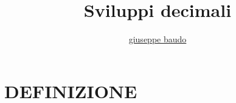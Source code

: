 \documentclass[a4Paper, 10pt]{article}
\title{Sviluppi decimali}
\author{\href{http://www.baudo.hol.es}{giuseppe baudo}}
\begin{document}
\maketitle


\section{DEFINIZIONE}
\end{document}
